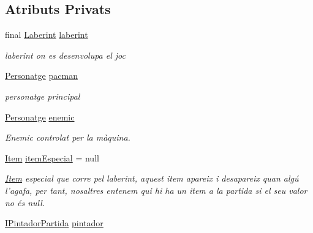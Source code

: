 \subsection*{Atributs Privats}
\begin{DoxyCompactItemize}
\item 
\hypertarget{classlogica_1_1_partida_a12062f14298f0ee05a92aedf4b14e301}{final \hyperlink{classlogica_1_1laberints_1_1_laberint}{Laberint} \hyperlink{classlogica_1_1_partida_a12062f14298f0ee05a92aedf4b14e301}{laberint}}\label{classlogica_1_1_partida_a12062f14298f0ee05a92aedf4b14e301}

\begin{DoxyCompactList}\small\item\em laberint on es desenvolupa el joc \end{DoxyCompactList}\item 
\hypertarget{classlogica_1_1_partida_a7a8e6c8daf205b7d6dcefd6ca58eb967}{\hyperlink{classlogica_1_1_personatge}{Personatge} \hyperlink{classlogica_1_1_partida_a7a8e6c8daf205b7d6dcefd6ca58eb967}{pacman}}\label{classlogica_1_1_partida_a7a8e6c8daf205b7d6dcefd6ca58eb967}

\begin{DoxyCompactList}\small\item\em personatge principal \end{DoxyCompactList}\item 
\hypertarget{classlogica_1_1_partida_ae634faef1c00ccb1658cd1aa4dde990f}{\hyperlink{classlogica_1_1_personatge}{Personatge} \hyperlink{classlogica_1_1_partida_ae634faef1c00ccb1658cd1aa4dde990f}{enemic}}\label{classlogica_1_1_partida_ae634faef1c00ccb1658cd1aa4dde990f}

\begin{DoxyCompactList}\small\item\em Enemic controlat per la màquina. \end{DoxyCompactList}\item 
\hypertarget{classlogica_1_1_partida_a2dcb6e6acb80d2c285796cf4a61635a2}{\hyperlink{classlogica_1_1_item}{Item} \hyperlink{classlogica_1_1_partida_a2dcb6e6acb80d2c285796cf4a61635a2}{item\+Especial} = null}\label{classlogica_1_1_partida_a2dcb6e6acb80d2c285796cf4a61635a2}

\begin{DoxyCompactList}\small\item\em \hyperlink{classlogica_1_1_item}{Item} especial que corre pel laberint, aquest item apareix i desapareix quan algú l'agafa, per tant, nosaltres entenem qui hi ha un item a la partida si el seu valor no és null. \end{DoxyCompactList}\item 
\hypertarget{classlogica_1_1_partida_a8896d14d62683416b4ec20a3257a9031}{\hyperlink{interfaceinterficie_1_1_i_pintador_partida}{I\+Pintador\+Partida} \hyperlink{classlogica_1_1_partida_a8896d14d62683416b4ec20a3257a9031}{pintador}}\label{classlogica_1_1_partida_a8896d14d62683416b4ec20a3257a9031}


\end{DoxyCompactItemize}
